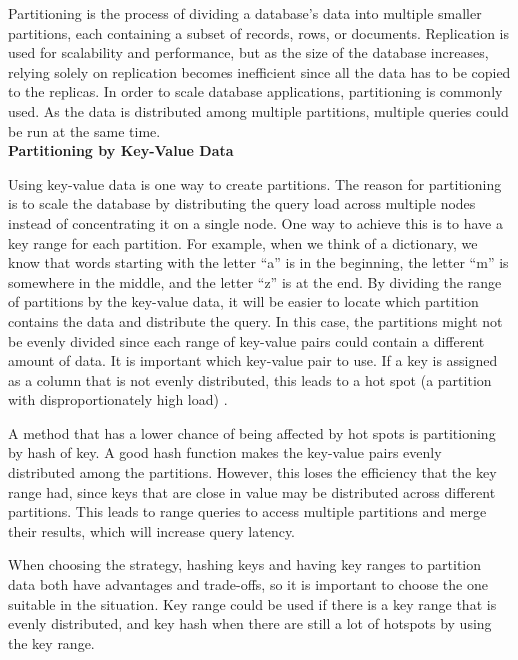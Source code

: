 Partitioning is the process of dividing a database’s data into multiple smaller partitions, each containing a subset of records, rows, or documents.
Replication is used for scalability and performance, but as the size of the database increases,
relying solely on replication becomes inefficient since all the data has to be copied to the replicas.
In order to scale database applications, partitioning is commonly used.
As the data is distributed among multiple partitions, multiple queries could be run at the same time. \\

\noindent \textbf{Partitioning by Key-Value Data}

Using key-value data is one way to create partitions. The reason for partitioning is to scale the database by distributing the query load
across multiple nodes instead of concentrating it on a single node.
One way to achieve this is to have a key range for each partition. For example, when we think of a dictionary,
we know that words starting with the letter “a” is in the beginning, the letter “m” is somewhere in the middle, and the letter “z” is at the end.
By dividing the range of partitions by the key-value data, it will be easier to locate which partition contains the data and distribute the query.
In this case, the partitions might not be evenly divided since each range of key-value pairs could contain a different amount of data.
It is important which key-value pair to use. If a key is assigned as a column that is not evenly distributed, this leads to a hot spot 
(a partition with disproportionately high load) \cite{Kleppmann_2017}.

A method that has a lower chance of being affected by hot spots is partitioning by hash of key.
A good hash function makes the key-value pairs evenly distributed among the partitions.
However, this loses the efficiency that the key range had, since keys that are close in value may be distributed across different partitions.
This leads to range queries to access multiple partitions and merge their results, which will increase query latency.  

When choosing the strategy, hashing keys and having key ranges to partition data both have advantages and trade-offs,
so it is important to choose the one suitable in the situation.
Key range could be used if there is a key range that is evenly distributed, 
and key hash when there are still a lot of hotspots by using the key range. \\

